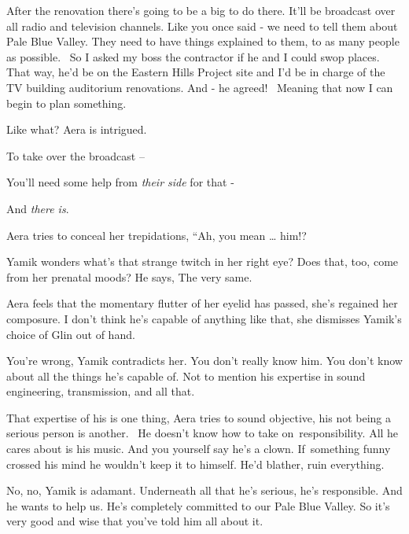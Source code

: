 \documentclass[letterpaper]{article}
\begin{document}
{\textquotedbl}After the renovation there's going to be a big to do there. It'll be broadcast over all radio and
television channels. Like you once said - we need to tell them about Pale Blue Valley. They need to have things
explained to them, to as many people as possible. \ So I asked my boss the contractor if he and I could swop places.
That way, he'd be on the Eastern Hills Project site and I'd be in charge of the TV building auditorium renovations. And
- he agreed! \ Meaning that now I can begin to plan something.{\textquotedbl} 

{\textquotedbl}Like what?{\textquotedbl} Aera is intrigued. 

{\textquotedbl}To take over the broadcast --{\textquotedbl} 

{\textquotedbl}You'll need some help from \textit{their side }for that -{\textquotedbl} 

{\textquotedbl}And \textit{there is}.{\textquotedbl} 

Aera tries to conceal her trepidations, ``Ah, you mean {\dots} him!?{\textquotedbl} 

Yamik wonders what's that strange twitch in her right eye? Does that, too, come from her prenatal moods? He says,
{\textquotedbl}The very same.{\textquotedbl} 

Aera feels that the momentary flutter of her eyelid has passed, she's regained her composure. {\textquotedbl}I don't
think he's capable of anything like that,{\textquotedbl} she dismisses Yamik's choice of Glin out of hand. ~

{\textquotedbl}You're wrong,{\textquotedbl} Yamik contradicts her. {\textquotedbl}You don't really know him. You don't
know about all the things he's capable of. Not to mention his expertise in sound engineering, transmission, and all
that.{\textquotedbl} 

{\textquotedbl}That expertise of his is one thing,{\textquotedbl} Aera tries to sound objective, {\textquotedbl}his not
being a serious person is another. \ He doesn't know how to take on~responsibility. All he cares about is his music.
And you yourself say he's a clown. If~something funny crossed his mind he wouldn't keep it to himself. He'd blather,
ruin everything.{\textquotedbl} 

{\textquotedbl}No, no,{\textquotedbl} Yamik is adamant. {\textquotedbl}Underneath all that he's serious, he's
responsible. And he wants to help us. He's completely committed to our Pale Blue Valley. So it's very good and wise
that you've told him all about it.{\textquotedbl} 
\end{document}
